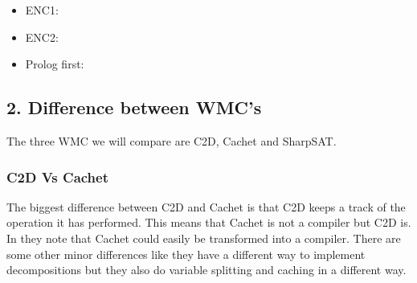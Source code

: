 \documentclass[a4paper,10pt]{report}
\begin{document}
\begin{itemize}
	\item ENC1:
	\item ENC2:
	\item Prolog first:
\end{itemize}


\subsection*{2. Difference between WMC's}
The three WMC we will compare are C2D, Cachet and SharpSAT.

\subsubsection*{C2D Vs Cachet}

The biggest difference between C2D and Cachet is that C2D keeps a track of the operation it has performed. This means that Cachet is not a compiler but C2D is. In \cite{CHAVIRA2008772} they note that Cachet could easily be transformed into a compiler. There are some other minor differences like they have a different way to implement decompositions but they also do variable splitting and caching in a different way.

\end{document}
